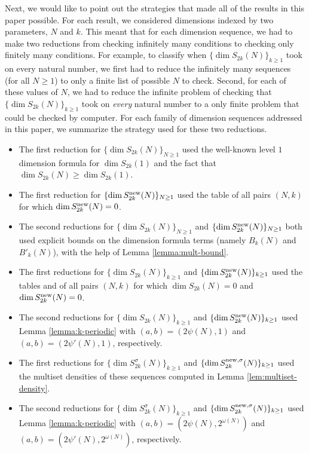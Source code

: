 \documentclass[12pt,letterpaper,reqno]{amsart}
\theoremstyle{definition}
\numberwithin{equation}{section}
\numberwithin{figure}{section}
\numberwithin{table}{section}
\newcommand{\nw}{{\textnormal{new}}}
\begin{document}
Next, we would like to point out the strategies that made all of the results in this paper possible. For each result, we considered dimensions indexed by two parameters, $N$ and $k$. This meant that for each dimension sequence, we had to make two reductions from checking infinitely many conditions to checking only finitely many conditions. For example, to classify when $\{\dim S_{2k}(N)\}_{k\ge 1}$ took on every natural number, we first had to reduce the infinitely many sequences (for all $N\ge 1$) to only a finite list of possible $N$ to check. Second, for each of these values of $N$, we had to reduce the infinite problem of checking that $\{\dim S_{2k}(N)\}_{k\ge 1}$ took on \textit{every} natural number to a only finite problem that could be checked by computer. For each family of dimension sequences addressed in this paper, we summarize the strategy used for these two reductions.
\begin{itemize}
    \item 
    The first reduction for $\{ \dim S_{2k}(N) \}_{N\ge1}$ used the well-known level $1$ dimension formula for $\dim S_{2k}(1)$ and the fact that $\dim S_{2k}(N) \ge \dim S_{2k}(1)$. 
    \item 
    The first reduction for $\{\dim S_{2k}^\nw(N) \}_{N\ge1}$ used the table \cite[Table 6.2]{ross} of all pairs $(N,k)$ for which $\dim S_{2k}^\nw(N) = 0$.
    \item 
    The second reductions for $\{ \dim S_{2k}(N) \}_{N\ge1}$ and $\{\dim S_{2k}^\nw(N) \}_{N\ge1}$ both used explicit bounds on the dimension formula terms (namely $B_k(N)$ and $B'_k(N)$), with the help of Lemma \ref{lemma:mult-bound}.
    \item
    The first reductions for $\{ \dim S_{2k}(N) \}_{k\ge1}$ and $\{ \dim S_{2k}^\nw(N) \}_{k\ge1}$ used the tables \cite[Table 2.6]{ross} and \cite[Table 6.2]{ross} of all pairs $(N,k)$ for which $\dim S_{2k}(N) = 0$ and $\dim S_{2k}^\nw(N) = 0$.
    \item 
    The second reductions for $\{ \dim S_{2k}(N) \}_{k\ge1}$ and $\{ \dim S_{2k}^\nw(N) \}_{k\ge1}$ used Lemma \ref{lemma:k-periodic} with $(a,b) = (2\psi(N),1)$ and $(a,b) = (2\psi'(N),1)$, respectively.
    \item 
    The first reductions for $\{ \dim S_{2k}^\sigma(N) \}_{k\ge1}$ and $\{ \dim S_{2k}^{\nw,\sigma}(N) \}_{k\ge1}$ used the multiset densities of these sequences computed in Lemma \ref{lem:multiset-density}.
    \item 
    The second reductions for $\{ \dim S_{2k}^\sigma(N) \}_{k\ge1}$ and $\{ \dim S_{2k}^{\nw,\sigma}(N) \}_{k\ge1}$ used Lemma \ref{lemma:k-periodic} with $(a,b) = (2\psi(N),2^{\omega(N)})$ and $(a,b) = (2\psi'(N),2^{\omega(N)})$, respectively.
\end{itemize}
\end{document}

